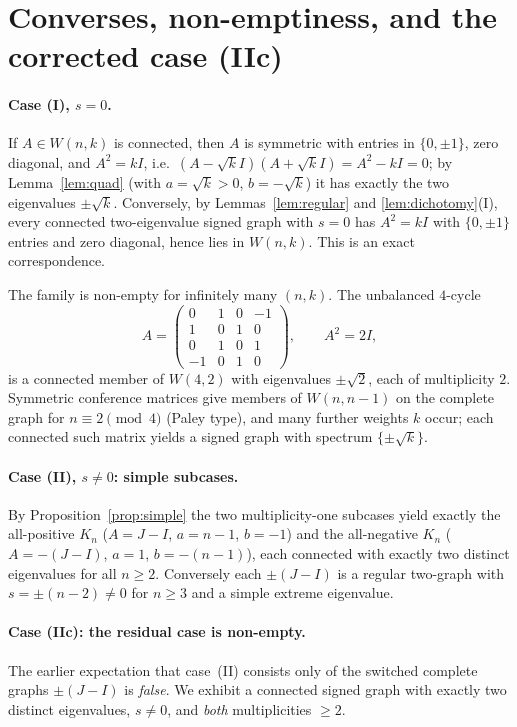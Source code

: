\documentclass{amsart}
\theoremstyle{definition}
\begin{document}
\section{Converses, non-emptiness, and the corrected case (IIc)}\label{sec:examples}

\paragraph{Case (I), $s=0$.}
If $A\in W(n,k)$ is connected, then $A$ is symmetric with entries in
$\{0,\pm1\}$, zero diagonal, and $A^2=kI$, i.e.\ $(A-\sqrt kI)(A+\sqrt kI)=
A^2-kI=0$; by Lemma~\ref{lem:quad} (with $a=\sqrt k>0$, $b=-\sqrt k$) it has
exactly the two eigenvalues $\pm\sqrt k$. Conversely, by
Lemmas~\ref{lem:regular} and \ref{lem:dichotomy}(I), every connected
two-eigenvalue signed graph with $s=0$ has $A^2=kI$ with $\{0,\pm1\}$ entries
and zero diagonal, hence lies in $W(n,k)$. This is an exact correspondence.

The family is non-empty for infinitely many $(n,k)$. The unbalanced $4$-cycle
\[
A=\begin{pmatrix}0&1&0&-1\\ 1&0&1&0\\ 0&1&0&1\\ -1&0&1&0\end{pmatrix},
\qquad A^2=2I,
\]
is a connected member of $W(4,2)$ with eigenvalues $\pm\sqrt2$, each of
multiplicity $2$. Symmetric conference matrices give members of $W(n,n-1)$ on
the complete graph for $n\equiv2\pmod4$ (Paley type), and many further weights
$k$ occur; each connected such matrix yields a signed graph with spectrum
$\{\pm\sqrt k\}$.

\paragraph{Case (II), $s\ne0$: simple subcases.}
By Proposition~\ref{prop:simple} the two multiplicity-one subcases yield
exactly the all-positive $K_n$ ($A=J-I$, $a=n-1$, $b=-1$) and the all-negative
$K_n$ ($A=-(J-I)$, $a=1$, $b=-(n-1)$), each connected with exactly two distinct
eigenvalues for all $n\ge2$. Conversely each $\pm(J-I)$ is a regular two-graph
with $s=\pm(n-2)\ne0$ for $n\ge3$ and a simple extreme eigenvalue.

\paragraph{Case (IIc): the residual case is non-empty.}
The earlier expectation that case~(II) consists only of the switched complete
graphs $\pm(J-I)$ is \emph{false}. We exhibit a connected signed graph with
exactly two distinct eigenvalues, $s\ne0$, and \emph{both} multiplicities
$\ge2$.
\end{document}
